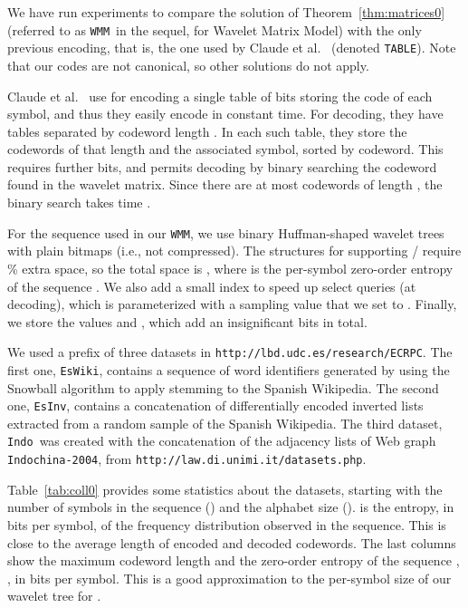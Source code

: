 \documentclass[preprint,12pt]{elsarticle}
\newcommand{\wmm}{\texttt{WMM}}
\newcommand{\tablen}{\texttt{TABLE}}
\begin{document}
\newcommand{\EsWiki}{\texttt{EsWiki}}
\newcommand{\EsInv}{\texttt{EsInv}}
\newcommand{\Indo}{\texttt{Indo}}
\newcommand{\ESInvD}{\texttt{ESInvD}}
\newcommand{\HH}{\mathcal{H}}
\newcommand{\LL}{\mathcal{L}}

We have run experiments to compare the solution of Theorem~\ref{thm:matrices0}
(referred to as \wmm\ in the sequel, for Wavelet Matrix Model) with the only
previous encoding, that is,
the one used by Claude et al.~\cite{CNO15} (denoted \tablen). Note that
our codes are not canonical, so other solutions \cite{GNNO15} do not apply.

Claude et al.~\cite{CNO15} use for encoding a single table of  bits
storing the code of each symbol, and thus they easily encode in constant time.
For decoding, they have tables separated by codeword length . In each such
table, they store the codewords of that length and the associated symbol,
sorted by codeword. This requires  further bits, and
permits decoding by binary searching the codeword found in the wavelet matrix.
Since there are at most  codewords of length , the binary search
takes time .

For the sequence  used in our \wmm, we use binary Huffman-shaped wavelet
trees with plain bitmaps (i.e., not compressed). The structures for supporting 
/ require \% extra space, so the total space is 
, where  is the per-symbol 
zero-order entropy of the sequence . We
also add a small index to speed up select queries \cite{NPsea12.1} (at
decoding), which is parameterized with a sampling value that we set to
. Finally, we store the values  and ,
which add an insignificant  bits in total.

We used a prefix of three datasets in \texttt{http://lbd.udc.es/research/ECRPC}.
The first one, \EsWiki, contains a sequence of word
identifiers generated by using the Snowball algorithm to apply stemming to the Spanish Wikipedia.
The second one, \EsInv, contains a concatenation of differentially encoded inverted lists extracted
from a random sample of the Spanish Wikipedia.
The third dataset, \Indo\ was created with the concatenation of the adjacency lists of Web graph
{\tt Indochina-2004}, from {\tt http://law.di.unimi.it/datasets.php}.

Table~\ref{tab:coll0} provides some statistics about the datasets, starting with
the number of symbols in the sequence () and the alphabet size ().
 is the entropy, in bits per symbol, of the frequency distribution 
observed in the sequence. This is close to the average length  of 
encoded and decoded codewords. The last columns show the maximum codeword 
length  and the zero-order entropy of the sequence , , in bits 
per symbol. This is a good approximation to the per-symbol size of our 
wavelet tree for .
\end{document}
